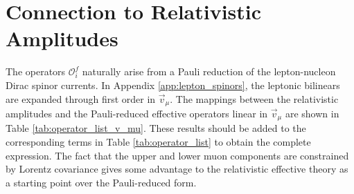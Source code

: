 \documentclass[12pt,letterpaper]{book}
\begin{document}
\section{Connection to Relativistic Amplitudes}
The operators $\mathcal{O}^f_i$ naturally arise from a Pauli reduction of the lepton-nucleon Dirac spinor currents. In Appendix \ref{app:lepton_spinors}, the leptonic bilinears are expanded through first order in $\vec{v}_{\mu}$. The mappings between the relativistic amplitudes and the Pauli-reduced effective operators linear in $\vec{v}_{\mu}$ are shown in Table \ref{tab:operator_list_v_mu}. These results should be added to the corresponding terms in Table \ref{tab:operator_list} to obtain the complete expression. The fact that the upper and lower muon components are constrained by Lorentz covariance gives some advantage to the relativistic effective theory as a starting point over the Pauli-reduced form.
\end{document}
